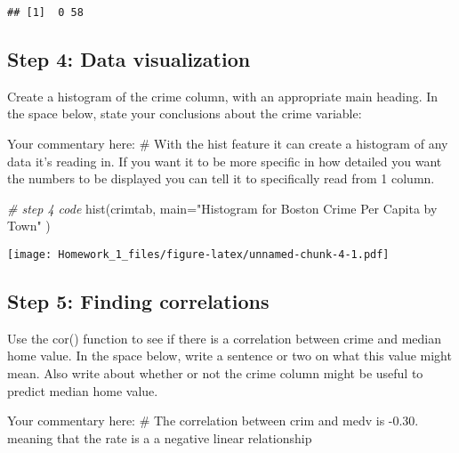 \documentclass[
]{article}
\newenvironment{Shaded}{\begin{snugshade}}{\end{snugshade}}
\newcommand{\AttributeTok}[1]{\textcolor[rgb]{0.77,0.63,0.00}{#1}}
\newcommand{\CommentTok}[1]{\textcolor[rgb]{0.56,0.35,0.01}{\textit{#1}}}
\newcommand{\FunctionTok}[1]{\textcolor[rgb]{0.00,0.00,0.00}{#1}}
\newcommand{\NormalTok}[1]{#1}
\newcommand{\SpecialCharTok}[1]{\textcolor[rgb]{0.00,0.00,0.00}{#1}}
\newcommand{\StringTok}[1]{\textcolor[rgb]{0.31,0.60,0.02}{#1}}
\begin{document}
\begin{verbatim}
## [1]  0 58
\end{verbatim}

\hypertarget{step-4-data-visualization}{%
\subsection{Step 4: Data
visualization}\label{step-4-data-visualization}}

Create a histogram of the crime column, with an appropriate main
heading. In the space below, state your conclusions about the crime
variable:

Your commentary here: \# With the hist feature it can create a histogram
of any data it's reading in. If you want it to be more specific in how
detailed you want the numbers to be displayed you can tell it to
specifically read from 1 column.

\begin{Shaded}
\begin{Highlighting}[]
\CommentTok{\# step 4 code}
\FunctionTok{hist}\NormalTok{(crimtab, }\AttributeTok{main=}\StringTok{"Histogram for Boston Crime Per Capita by Town"}\NormalTok{ )}
\end{Highlighting}
\end{Shaded}

\texttt{[image: Homework\_1\_files/figure-latex/unnamed-chunk-4-1.pdf]}

\hypertarget{step-5-finding-correlations}{%
\subsection{Step 5: Finding
correlations}\label{step-5-finding-correlations}}

Use the cor() function to see if there is a correlation between crime
and median home value. In the space below, write a sentence or two on
what this value might mean. Also write about whether or not the crime
column might be useful to predict median home value.

Your commentary here: \# The correlation between crim and medv is -0.30.
meaning that the rate is a a negative linear relationship

\begin{Shaded}
\end{Shaded}
\end{document}
